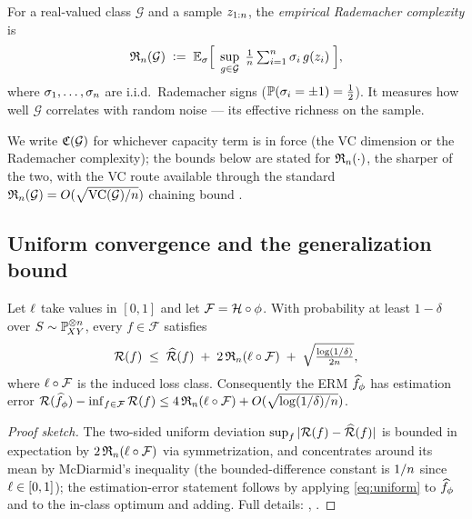 \begin{definition}
\label{def:rademacher}
For a real-valued class $\mathcal{G}$ and a sample
$z_{1:n}$, the \emph{empirical Rademacher complexity} is
\[
  \mathfrak{R}_n(\mathcal{G})
  \;\vcentcolon=\;
  \mathbb{E}_{\sigma}\Big[\;
    \sup_{g\in\mathcal{G}}\;
    \tfrac1{n}\textstyle\sum_{i=1}^{n}\sigma_i\,g(z_i)
  \;\Big],
\]
where $\sigma_1,\dots,\sigma_{n}$ are i.i.d.\ Rademacher signs
($\mathbb{P}(\sigma_i=\pm1)=\tfrac12$). It measures how well $\mathcal{G}$
correlates with random noise --- its effective richness on the sample.
\end{definition}

We write $\mathfrak{C}(\mathcal{G})$ for whichever capacity term is in force (the VC
dimension or the Rademacher complexity); the bounds below are stated for
$\mathfrak{R}_n(\cdot)$, the sharper of the two, with the VC route available through the
standard $\mathfrak{R}_n(\mathcal{G}) = O(\sqrt{\mathrm{VC}(\mathcal{G})/n})$
chaining bound \citep[Ch.~6]{shalevshwartz2014}.

\subsection{Uniform convergence and the generalization bound}
\label{subsec:uniform}

\begin{theorem}
\label{thm:uniform}
Let $\ell$ take values in $[0,1]$ and let $\mathcal{F}=\mathcal{H}\circ\phi$.
With probability at least $1-\delta$ over $S\sim\mathbb{P}_{\!XY}^{\otimes n}$, every
$f\in\mathcal{F}$ satisfies
\begin{equation}
  \label{eq:uniform}
  \mathcal{R}(f) \;\le\; \widehat{\mathcal{R}}(f)
  \;+\; 2\,\mathfrak{R}_n(\ell\circ\mathcal{F})
  \;+\; \sqrt{\tfrac{\log(1/\delta)}{2n}},
\end{equation}
where $\ell\circ\mathcal{F}$ is the induced loss class. Consequently the ERM
$\widehat{f}_{\phi}$ has estimation error
$\mathcal{R}(\widehat{f}_{\phi}) - \inf_{f\in\mathcal{F}}\mathcal{R}(f)
   \le 4\,\mathfrak{R}_n(\ell\circ\mathcal{F}) + O(\sqrt{\log(1/\delta)/n})$.
\end{theorem}

\begin{proof}[Proof sketch]
The two-sided uniform deviation $\sup_{f}|\mathcal{R}(f)-\widehat{\mathcal{R}}(f)|$ is bounded in
expectation by $2\,\mathfrak{R}_n(\ell\circ\mathcal{F})$ via symmetrization, and
concentrates around its mean by McDiarmid's inequality (the bounded-difference
constant is $1/n$ since $\ell\in[0,1]$); the estimation-error
statement follows by applying \eqref{eq:uniform} to $\widehat{f}_{\phi}$ and to
the in-class optimum and adding. Full details:
\citet[Thm.~26.5]{shalevshwartz2014}, \citet[Ch.~3]{mohri2018}.
\end{proof}

